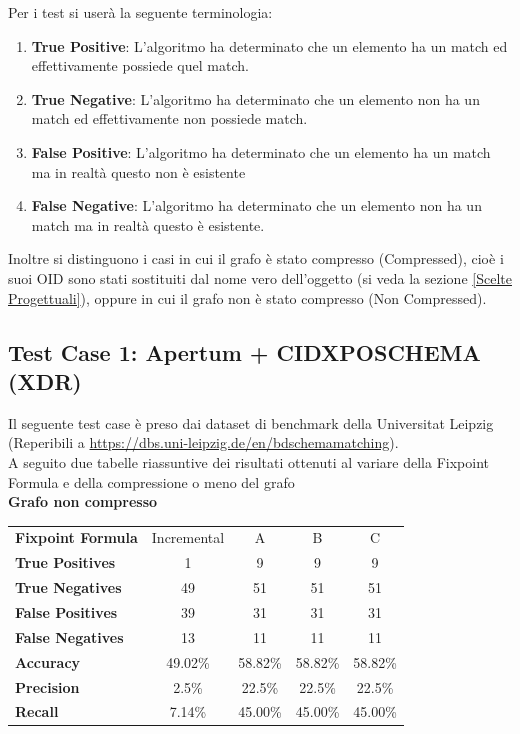 \documentclass[a4paper,10pt]{article}
\begin{document}
Per i test si userà la seguente terminologia:
\begin{enumerate}
	\item \textbf{True Positive}: L'algoritmo ha determinato che un elemento ha un match ed effettivamente possiede quel match.
	\item \textbf{True Negative}: L'algoritmo ha determinato che un elemento non ha un match ed effettivamente non possiede match.
	\item \textbf{False Positive}: L'algoritmo ha determinato che un elemento ha un match ma in realtà questo non è esistente
	\item \textbf{False Negative}: L'algoritmo ha determinato che un elemento non ha un match ma in realtà questo è esistente.
\end{enumerate}

Inoltre si distinguono i casi in cui il grafo è stato compresso (Compressed), cioè i suoi OID sono stati sostituiti dal nome vero dell'oggetto (si veda la sezione \ref{Scelte Progettuali}), oppure in cui il grafo non è stato compresso (Non Compressed).

\newpage

\subsection{Test Case 1: Apertum + CIDXPOSCHEMA (XDR)}

Il seguente test case è preso dai dataset di benchmark della Universitat Leipzig (Reperibili a \url{https://dbs.uni-leipzig.de/en/bdschemamatching}).\\

A seguito due tabelle riassuntive dei risultati ottenuti al variare della Fixpoint Formula e della compressione o meno del grafo\\

\textbf{Grafo non compresso}

\begin{center}
\begin{tabular}{| l | c | c | c | c |}
	\hline
	\textbf{Fixpoint Formula} & Incremental & A & B & C\\
	\hhline{|=|=|=|=|=|}
	\textbf{True Positives} & 1 & 9 & 9 & 9\\
	\hline
	\textbf{True Negatives} & 49 & 51 & 51 & 51\\
	\hline
	\textbf{False Positives} & 39 & 31 & 31 & 31\\
	\hline
	\textbf{False Negatives} & 13 & 11 & 11 & 11\\
	\hline
	\textbf{Accuracy} & 49.02\% & 58.82\% & 58.82\% & 58.82\%\\
	\hline
	\textbf{Precision} & 2.5\% & 22.5\% & 22.5\% & 22.5\%\\
	\hline
	\textbf{Recall} & 7.14\% & 45.00\% & 45.00\% & 45.00\%\\
	\hline
\end{tabular}
\end{center}
\vspace{4mm}
\end{document}
